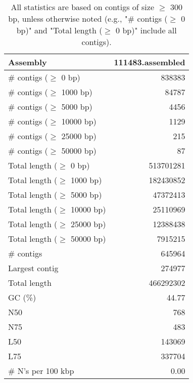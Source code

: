 \documentclass[12pt,a4paper]{article}
\begin{document}
\begin{table}[ht]
\begin{center}
\caption{All statistics are based on contigs of size $\geq$ 300 bp, unless otherwise noted (e.g., "\# contigs ($\geq$ 0 bp)" and "Total length ($\geq$ 0 bp)" include all contigs).}
\begin{tabular}{|l*{1}{|r}|}
\hline
Assembly & 111483.assembled \\ \hline
\# contigs ($\geq$ 0 bp) & 838383 \\ \hline
\# contigs ($\geq$ 1000 bp) & 84787 \\ \hline
\# contigs ($\geq$ 5000 bp) & 4456 \\ \hline
\# contigs ($\geq$ 10000 bp) & 1129 \\ \hline
\# contigs ($\geq$ 25000 bp) & 215 \\ \hline
\# contigs ($\geq$ 50000 bp) & 87 \\ \hline
Total length ($\geq$ 0 bp) & 513701281 \\ \hline
Total length ($\geq$ 1000 bp) & 182430852 \\ \hline
Total length ($\geq$ 5000 bp) & 47372413 \\ \hline
Total length ($\geq$ 10000 bp) & 25110969 \\ \hline
Total length ($\geq$ 25000 bp) & 12388438 \\ \hline
Total length ($\geq$ 50000 bp) & 7915215 \\ \hline
\# contigs & 645964 \\ \hline
Largest contig & 274977 \\ \hline
Total length & 466292302 \\ \hline
GC (\%) & 44.77 \\ \hline
N50 & 768 \\ \hline
N75 & 483 \\ \hline
L50 & 143069 \\ \hline
L75 & 337704 \\ \hline
\# N's per 100 kbp & 0.00 \\ \hline
\end{tabular}
\end{center}
\end{table}
\end{document}

